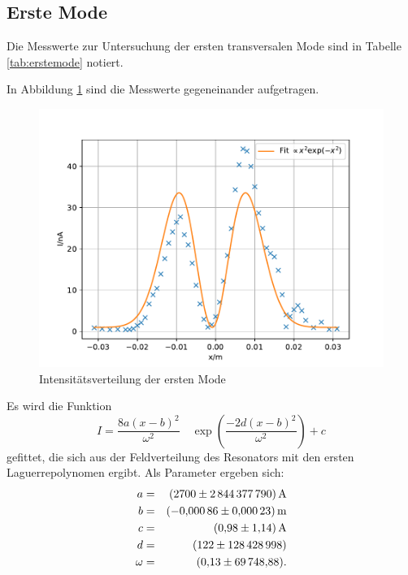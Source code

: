 \subsection{Erste Mode}
Die Messwerte zur Untersuchung der ersten transversalen Mode sind in Tabelle \ref{tab:erstemode} notiert.

In Abbildung \ref{fig:erstemode} sind die Messwerte gegeneinander aufgetragen.
\begin{figure}
  \centering
  \includegraphics[width=\textwidth]{erstemode.pdf}
  \caption{Intensitätsverteilung der ersten Mode}
  \label{fig:erstemode}
\end{figure}
Es wird die Funktion
\begin{equation*}
  I = \frac{8 a (x-b)^2}{\omega^2} \quad \exp{ \left( \frac{-2d(x-b)^2}{\omega^2} \right)}+c
\end{equation*}
gefittet, die sich aus der Feldverteilung des Resonators mit den ersten Laguerrepolynomen ergibt.
Als Parameter ergeben sich:
\begin{align*}
  a      &=& \SI{  2700 \pm 2844377790 }{A} \\
  b      &=& \SI{ -0.00086 \pm 0.00023 }{m} \\
  c      &=& \SI{  0.98 \pm 1.14 }{A} \\
  d      &=& \SI{  122 \pm 128428998 }{} \\
  \omega &=& \SI{  0.13 \pm 69748.88 }{} .\\
\end{align*}
%
%
\FloatBarrier

